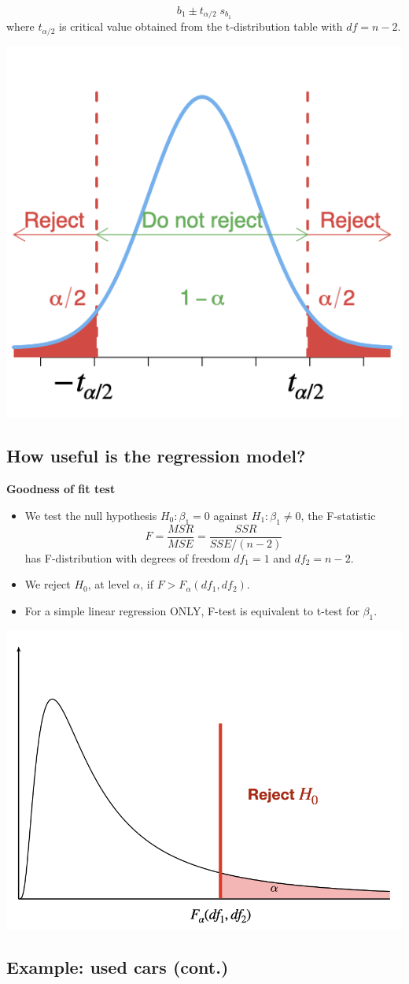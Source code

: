 \documentclass[
]{article}
\begin{document}
\[b_1 \pm t_{\alpha/2} \;s_{b_1}\] where \(t_{\alpha/2}\) is critical
value obtained from the t‐distribution table with \(df=n-2\).

\begin{center}\includegraphics[width=0.3\linewidth,height=0.3\textheight]{figures/Ttest2} \end{center}

\hypertarget{how-useful-is-the-regression-model}{%
\subsection{How useful is the regression
model?}\label{how-useful-is-the-regression-model}}

\textbf{Goodness of fit test}

\begin{itemize}
\item
  We test the null hypothesis \(H_0:\beta_1=0\) against
  \(H_1:\beta_1\neq 0\), the F-statistic
  \[F=\frac{MSR}{MSE}=\frac{SSR}{SSE/(n-2)}\] has F-distribution with
  degrees of freedom \(df_1=1\) and \(df_2=n-2\).
\item
  We reject \(H_0\), at level \(\alpha\), if
  \(F>F_{\alpha}(df_1,df_2)\).
\item
  For a simple linear regression ONLY, F-test is equivalent to t-test
  for \(\beta_1\).
\end{itemize}

\begin{center}\includegraphics[width=0.4\linewidth,height=0.4\textheight]{figures/Ftest} \end{center}

\hypertarget{example-used-cars-cont.}{%
\subsection{Example: used cars (cont.)}\label{example-used-cars-cont.}}
\end{document}
